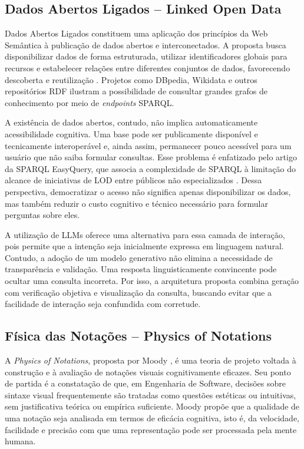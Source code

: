 \documentclass[10pt,a4paper]{article}
\begin{document}
\subsection{Dados Abertos Ligados -- Linked Open Data}

Dados Abertos Ligados constituem uma aplicação dos princípios da Web Semântica à publicação de dados abertos e interconectados. A proposta busca disponibilizar dados de forma estruturada, utilizar identificadores globais para recursos e estabelecer relações entre diferentes conjuntos de dados, favorecendo descoberta e reutilização \cite{isotani2015}. Projetos como DBpedia, Wikidata e outros repositórios RDF ilustram a possibilidade de consultar grandes grafos de conhecimento por meio de \textit{endpoints} SPARQL.

A existência de dados abertos, contudo, não implica automaticamente acessibilidade cognitiva. Uma base pode ser publicamente disponível e tecnicamente interoperável e, ainda assim, permanecer pouco acessível para um usuário que não saiba formular consultas. Esse problema é enfatizado pelo artigo da SPARQL EasyQuery, que associa a complexidade de SPARQL à limitação do alcance de iniciativas de LOD entre públicos não especializados \cite{easyquery}. Dessa perspectiva, democratizar o acesso não significa apenas disponibilizar os dados, mas também reduzir o custo cognitivo e técnico necessário para formular perguntas sobre eles.

A utilização de LLMs oferece uma alternativa para essa camada de interação, pois permite que a intenção seja inicialmente expressa em linguagem natural. Contudo, a adoção de um modelo generativo não elimina a necessidade de transparência e validação. Uma resposta linguisticamente convincente pode ocultar uma consulta incorreta. Por isso, a arquitetura proposta combina geração com verificação objetiva e visualização da consulta, buscando evitar que a facilidade de interação seja confundida com corretude.

\subsection{Física das Notações -- Physics of Notations}

A \textit{Physics of Notations}, proposta por Moody \cite{moody2009}, é uma teoria de projeto voltada à construção e à avaliação de notações visuais cognitivamente eficazes. Seu ponto de partida é a constatação de que, em Engenharia de Software, decisões sobre sintaxe visual frequentemente são tratadas como questões estéticas ou intuitivas, sem justificativa teórica ou empírica suficiente. Moody propõe que a qualidade de uma notação seja analisada em termos de eficácia cognitiva, isto é, da velocidade, facilidade e precisão com que uma representação pode ser processada pela mente humana.
\end{document}

